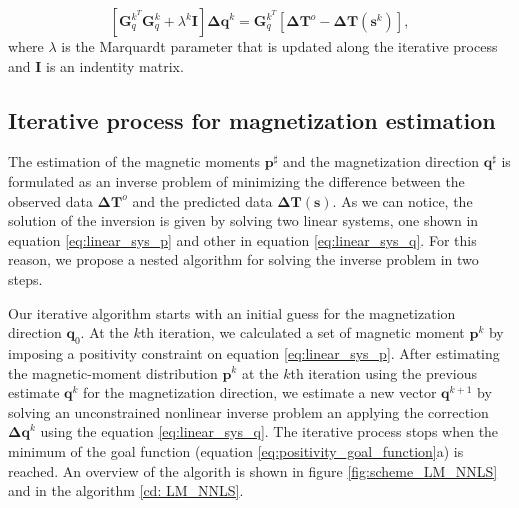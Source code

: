 \begin{equation}
\left[ \mathbf{G}_{q}^{k^T} \mathbf{G}_{q}^{k} + \lambda^k \mathbf{I} \right] \mathbf{\Delta q}^k = \mathbf{G}_{q}^{k^T}[ \mathbf{\Delta T}^o -  \mathbf{\Delta T} (\mathbf{s}^k) ],
\label{eq:linear_sys_q}
\end{equation}
where $\lambda$ is the Marquardt parameter that is updated along the iterative process and $\mathbf{I}$ is an indentity matrix.

\subsection{Iterative process for magnetization estimation}

The estimation of the magnetic moments $\mathbf{p}^{\sharp}$ and the magnetization direction $\mathbf{q}^{\sharp}$ is formulated as an inverse problem of minimizing the difference between the observed data $ \mathbf{\Delta T}^o $ and the predicted data $\mathbf{\Delta T} (\mathbf{s})$. As we can notice, the solution of the inversion is given by solving two linear systems, one shown in equation \ref{eq:linear_sys_p} and other in equation \ref{eq:linear_sys_q}. For this reason, we propose a nested algorithm for solving the inverse problem in two steps.           

Our iterative algorithm starts with an initial guess for the magnetization direction $\mathbf{q}_0$. At the $k$th iteration, we  calculated a set of magnetic moment $\mathbf{p}^k$ by imposing a positivity constraint on equation \ref{eq:linear_sys_p}. After estimating the magnetic-moment distribution $\mathbf{p}^k$ at the $k$th iteration using the previous estimate $\mathbf{q}^{k}$ for the magnetization direction, we estimate a new vector $\mathbf{q}^{k+1}$ by solving an unconstrained nonlinear inverse problem an applying the correction $\mathbf{\Delta q}^k$ using the equation \ref{eq:linear_sys_q}. The iterative process stops when the minimum of the goal function (equation \ref{eq:positivity_goal_function}a) is reached. An overview of the algorith is shown in figure \ref{fig:scheme_LM_NNLS} and in the algorithm \ref{cd: LM_NNLS}. 

